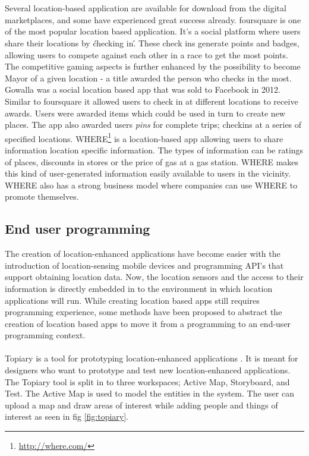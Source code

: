 \\\\
Several location-based application are available for download from the digital marketplaces, and some have experienced great success already. foursquare is one of the most popular location based application. It's a social platform where users share their locations by \'checking in\'. These check ins generate points and badges, allowing users to compete against each other in a race to get the most points. The competitive gaming aspects is further enhanced by the possibility to become Mayor of a given location - a title awarded the person who checks in the most. Gowalla was a social location based app that was sold to Facebook in 2012. Similar to foursquare it allowed users to check in at different locations to receive awards. Users were awarded items which could be used in turn to create new places. The app also awarded users \emph{pins} for complete trips; checkins at a series of specified locations. WHERE\footnote{\url{http://where.com/}} is a location-based app allowing users to share information location specific information. The types of information can be ratings of places, discounts in stores or the price of gas at a gas station. WHERE makes this kind of user-generated information easily available to users in the vicinity. WHERE also has a strong business model where companies can use WHERE to promote themselves. 

\subsection{End user programming} %
\label{sub:end_user_programming}
The creation of location-enhanced applications have become easier with the introduction of location-sensing mobile devices and programming API's that support obtaining location data. Now, the location sensors and the access to their information is directly embedded in to the environment in which location applications will run. While creating location based apps still requires programming experience, some methods have been proposed to abstract the creation of location based apps to move it from a programming to an end-user programming context. 
\\\\
Topiary is a tool for prototyping location-enhanced applications \cite{Li:2004:TTP:1029632.1029671}. It is meant for designers who want to prototype and test new location-enhanced applications. The Topiary tool is split in to three workspaces; Active Map, Storyboard, and Test. The Active Map is used to model the entities in the system. The user can upload a map and draw areas of interest while adding people and things of interest as seen in fig \ref{fig:topiary}.


